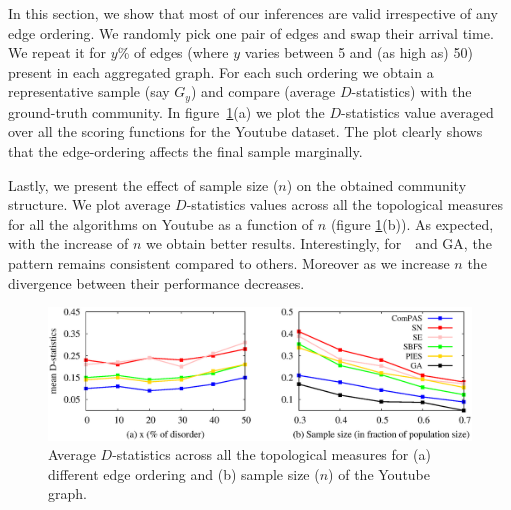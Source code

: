 \label{sec:effect}
In this section, we show that most of our inferences are valid irrespective of any edge ordering. We randomly pick one pair of edges and swap their arrival time. 
We repeat it for $y$\% of edges (where $y$ varies between 5 and (as high as) 50) present in each aggregated graph. %
For each such ordering we obtain a representative sample (say $G_y$) and compare (average $D$-statistics)  with 
the ground-truth community. 
In figure~\ref{param_est_1}(a) we plot the $D$-statistics value averaged over all the scoring functions for the Youtube dataset. The plot clearly shows that the edge-ordering  
affects the final sample marginally.

Lastly, we present the effect of sample size ($n$) on the obtained community structure. We plot average $D$-statistics values across all the topological measures for all the algorithms on Youtube as a function of $n$ (figure \ref{param_est_1}(b)). As expected, with the increase of $n$ we obtain better results. Interestingly, for~\compas~and GA, the pattern remains consistent compared to others. Moreover as we increase $n$ the divergence between their performance decreases.

\begin{figure}[!h]
\centering
\includegraphics[width=0.8\columnwidth]{./texfiles/Chapter_2/figures/param_estimate_1.eps}
\caption{\label{param_est_1}Average $D$-statistics across all the topological measures for (a) different edge ordering and (b) sample size ($n$) of the Youtube graph.}
\vspace{4mm}
\end{figure}






